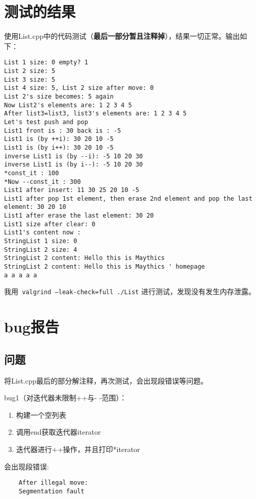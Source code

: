 \documentclass[UTF8]{ctexart}
\begin{document}
\section{测试的结果}

使用List.cpp中的代码测试（\textbf{最后一部分暂且注释掉}），结果一切正常。输出如下：

\begin{verbatim}
List 1 size: 0 empty? 1
List 2 size: 5
List 3 size: 5
List 4 size: 5, List 2 size after move: 0
List 2's size becomes: 5 again
Now List2's elements are: 1 2 3 4 5
After list3=list3, list3's elements are: 1 2 3 4 5
Let's test push and pop
List1 front is : 30 back is : -5
List1 is (by ++i): 30 20 10 -5
List1 is (by i++): 30 20 10 -5
inverse List1 is (by --i): -5 10 20 30
inverse List1 is (by i--): -5 10 20 30
*const_it : 100
*Now --const_it : 300
List1 after insert: 11 30 25 20 10 -5
List1 after pop 1st element, then erase 2nd element and pop the last element: 30 20 10
List1 after erase the last element: 30 20
List1 size after clear: 0
List1's content now :
StringList 1 size: 0
StringList 2 size: 4
StringList 2 content: Hello this is Maythics
StringList 2 content: Hello this is Maythics ' homepage
a a a a a
\end{verbatim}

我用\texttt{ valgrind --leak-check=full  ./List} 进行测试，发现没有发生内存泄露。

\section{bug报告}

\subsection{问题}

将List.cpp最后的部分解注释，再次测试，会出现段错误等问题。\

bug1（对迭代器未限制++与- -范围）：\

\begin{enumerate}
    \item 构建一个空列表
    \item 调用end获取迭代器iterator
    \item 迭代器进行++操作，并且打印*iterator
\end{enumerate}

会出现段错误:
\begin{verbatim}
    After illegal move:
    Segmentation fault
\end{verbatim}
\end{document}
